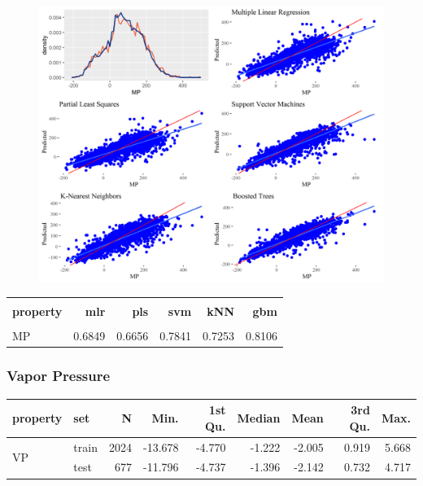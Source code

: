 \documentclass[10pt, letter]{article}
\renewcommand{\=}{\, =\, }
\newcommand{\+}{\, +\, }
\renewcommand{\-}{\, -\, }
\begin{document}
\begin{figure}[H]
  \centering
    \includegraphics[width=1.0\textwidth]{MP_plots.png}
\end{figure}

\begin{table}[H]
\begin{center}
\begin{tabular}{lrrrrr}
\toprule
&&\\
{\bf property} & {\bf mlr} & {\bf pls} &  {\bf svm}  & {\bf kNN}  & {\bf gbm}\\
\midrule
&&\\
MP  &   0.6849 & 0.6656 & 0.7841 & 0.7253 & 0.8106\\
\midrule
\hline
\end{tabular}
\end{center}
\end{table}

\subsubsection{Vapor Pressure}

\begin{table}[H]
\begin{center}
\begin{tabular}{llrrrrrrr}
\toprule
{\bf property} & {\bf set} & {\bf N} & {\bf Min.} & {\bf 1st Qu.} &  {\bf Median}  & {\bf Mean}  & {\bf 3rd Qu.} & {\bf Max.}\\
\midrule
\multirow{2}{15mm}{VP}
& train &  2024 & -13.678 & -4.770 & -1.222 & -2.005 & 0.919 & 5.668\\
& test &  677 & -11.796 & -4.737 & -1.396 & -2.142 & 0.732 & 4.717\\
\midrule
\hline
\end{tabular}
\end{center}
\end{table}
\end{document}
